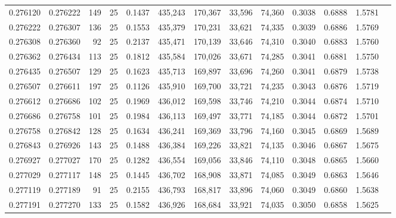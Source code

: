 \begin{tabular}{rrrrrrrrrrrrr}
0.276120 & 0.276222 &   149 &  25 &                                     0.1437 & 435,243 & 170,367 &  33,596 &  74,360 & 0.3038 & 0.6888 & 1.5781 \\
0.276222 & 0.276307 &   136 &  25 &                                     0.1553 & 435,379 & 170,231 &  33,621 &  74,335 & 0.3039 & 0.6886 & 1.5769 \\
0.276308 & 0.276360 &    92 &  25 &                                     0.2137 & 435,471 & 170,139 &  33,646 &  74,310 & 0.3040 & 0.6883 & 1.5760 \\
0.276362 & 0.276434 &   113 &  25 &                                     0.1812 & 435,584 & 170,026 &  33,671 &  74,285 & 0.3041 & 0.6881 & 1.5750 \\
0.276435 & 0.276507 &   129 &  25 &                                     0.1623 & 435,713 & 169,897 &  33,696 &  74,260 & 0.3041 & 0.6879 & 1.5738 \\
0.276507 & 0.276611 &   197 &  25 &                                     0.1126 & 435,910 & 169,700 &  33,721 &  74,235 & 0.3043 & 0.6876 & 1.5719 \\
0.276612 & 0.276686 &   102 &  25 &                                     0.1969 & 436,012 & 169,598 &  33,746 &  74,210 & 0.3044 & 0.6874 & 1.5710 \\
0.276686 & 0.276758 &   101 &  25 &                                     0.1984 & 436,113 & 169,497 &  33,771 &  74,185 & 0.3044 & 0.6872 & 1.5701 \\
0.276758 & 0.276842 &   128 &  25 &                                     0.1634 & 436,241 & 169,369 &  33,796 &  74,160 & 0.3045 & 0.6869 & 1.5689 \\
0.276843 & 0.276926 &   143 &  25 &                                     0.1488 & 436,384 & 169,226 &  33,821 &  74,135 & 0.3046 & 0.6867 & 1.5675 \\
0.276927 & 0.277027 &   170 &  25 &                                     0.1282 & 436,554 & 169,056 &  33,846 &  74,110 & 0.3048 & 0.6865 & 1.5660 \\
0.277029 & 0.277117 &   148 &  25 &                                     0.1445 & 436,702 & 168,908 &  33,871 &  74,085 & 0.3049 & 0.6863 & 1.5646 \\
0.277119 & 0.277189 &    91 &  25 &                                     0.2155 & 436,793 & 168,817 &  33,896 &  74,060 & 0.3049 & 0.6860 & 1.5638 \\
0.277191 & 0.277270 &   133 &  25 &                                     0.1582 & 436,926 & 168,684 &  33,921 &  74,035 & 0.3050 & 0.6858 & 1.5625 \\

\end{tabular}
